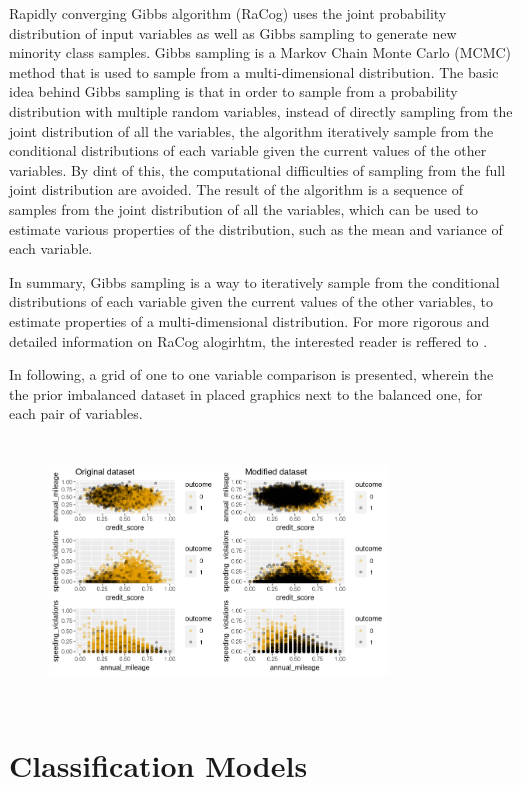 \documentclass{article}
\begin{document}
Rapidly converging Gibbs algorithm (RaCog) uses the joint probability
distribution of input variables as well as Gibbs sampling to generate
new minority class samples. Gibbs sampling is a Markov Chain Monte Carlo
(MCMC) method \cite{bishop} that is used to sample from a
multi-dimensional distribution. The basic idea behind Gibbs sampling is
that in order to sample from a probability distribution with multiple
random variables, instead of directly sampling from the joint
distribution of all the variables, the algorithm iteratively sample from
the conditional distributions of each variable given the current values
of the other variables. By dint of this, the computational difficulties
of sampling from the full joint distribution are avoided. The result of
the algorithm is a sequence of samples from the joint distribution of
all the variables, which can be used to estimate various properties of
the distribution, such as the mean and variance of each variable.

In summary, Gibbs sampling is a way to iteratively sample from the
conditional distributions of each variable given the current values of
the other variables, to estimate properties of a multi-dimensional
distribution. For more rigorous and detailed information on RaCog
alogirhtm, the interested reader is reffered to \cite{racog}.

In following, a grid of one to one variable comparison is presented,
wherein the the prior imbalanced dataset in placed graphics next to the
balanced one, for each pair of variables.

\begin{figure}[htbp] 
    \centerline{\includegraphics[width=9cm, height=7cm]{./figures/plotcompare.png}}
\end{figure}

\hypertarget{classification-models}{%
\section{Classification Models}\label{classification-models}}
\end{document}
